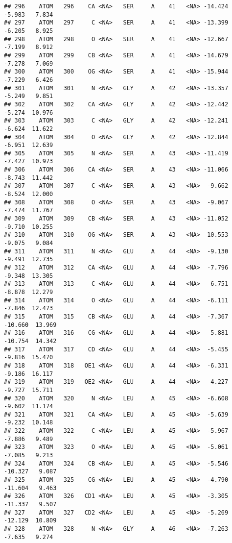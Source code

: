 \documentclass[
]{article}
\begin{document}
\begin{verbatim}
## 296    ATOM   296    CA <NA>   SER     A    41   <NA> -14.424  -5.983   7.834
## 297    ATOM   297     C <NA>   SER     A    41   <NA> -13.399  -6.205   8.925
## 298    ATOM   298     O <NA>   SER     A    41   <NA> -12.667  -7.199   8.912
## 299    ATOM   299    CB <NA>   SER     A    41   <NA> -14.679  -7.278   7.069
## 300    ATOM   300    OG <NA>   SER     A    41   <NA> -15.944  -7.229   6.426
## 301    ATOM   301     N <NA>   GLY     A    42   <NA> -13.357  -5.249   9.851
## 302    ATOM   302    CA <NA>   GLY     A    42   <NA> -12.442  -5.274  10.976
## 303    ATOM   303     C <NA>   GLY     A    42   <NA> -12.241  -6.624  11.622
## 304    ATOM   304     O <NA>   GLY     A    42   <NA> -12.844  -6.951  12.639
## 305    ATOM   305     N <NA>   SER     A    43   <NA> -11.419  -7.427  10.973
## 306    ATOM   306    CA <NA>   SER     A    43   <NA> -11.066  -8.743  11.442
## 307    ATOM   307     C <NA>   SER     A    43   <NA>  -9.662  -8.524  12.000
## 308    ATOM   308     O <NA>   SER     A    43   <NA>  -9.067  -7.474  11.767
## 309    ATOM   309    CB <NA>   SER     A    43   <NA> -11.052  -9.710  10.255
## 310    ATOM   310    OG <NA>   SER     A    43   <NA> -10.553  -9.075   9.084
## 311    ATOM   311     N <NA>   GLU     A    44   <NA>  -9.130  -9.491  12.735
## 312    ATOM   312    CA <NA>   GLU     A    44   <NA>  -7.796  -9.348  13.305
## 313    ATOM   313     C <NA>   GLU     A    44   <NA>  -6.751  -8.878  12.279
## 314    ATOM   314     O <NA>   GLU     A    44   <NA>  -6.111  -7.846  12.473
## 315    ATOM   315    CB <NA>   GLU     A    44   <NA>  -7.367 -10.660  13.969
## 316    ATOM   316    CG <NA>   GLU     A    44   <NA>  -5.881 -10.754  14.342
## 317    ATOM   317    CD <NA>   GLU     A    44   <NA>  -5.455  -9.816  15.470
## 318    ATOM   318   OE1 <NA>   GLU     A    44   <NA>  -6.331  -9.186  16.117
## 319    ATOM   319   OE2 <NA>   GLU     A    44   <NA>  -4.227  -9.727  15.711
## 320    ATOM   320     N <NA>   LEU     A    45   <NA>  -6.608  -9.602  11.174
## 321    ATOM   321    CA <NA>   LEU     A    45   <NA>  -5.639  -9.232  10.148
## 322    ATOM   322     C <NA>   LEU     A    45   <NA>  -5.967  -7.886   9.489
## 323    ATOM   323     O <NA>   LEU     A    45   <NA>  -5.061  -7.085   9.213
## 324    ATOM   324    CB <NA>   LEU     A    45   <NA>  -5.546 -10.327   9.087
## 325    ATOM   325    CG <NA>   LEU     A    45   <NA>  -4.790 -11.604   9.463
## 326    ATOM   326   CD1 <NA>   LEU     A    45   <NA>  -3.305 -11.337   9.507
## 327    ATOM   327   CD2 <NA>   LEU     A    45   <NA>  -5.269 -12.129  10.809
## 328    ATOM   328     N <NA>   GLY     A    46   <NA>  -7.263  -7.635   9.274

\end{verbatim}
\end{document}
